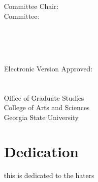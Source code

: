 \documentclass[12pt]{report}
\begin{document}
  \hspace{0.33\textwidth}
  \begin{minipage}[t]{0.33\textwidth}
  Committee Chair:\\
  Committee: \\
  \end{minipage}%
  \begin{minipage}[t]{0.33\textwidth}
  \begin{flushright}
   \\
   \\
   \\
  \end{flushright}
  \end{minipage}%
  \vspace{1cm}
  
  \parbox[b]{\textwidth}{
  Electronic Version Approved:\\\\\\
  Office of Graduate Studies\\
  College of Arts and Sciences\\
  Georgia State University\\
   
  }


\setcounter{page}{4}
  


\tableofcontents
\newpage

{}
\listoftables
\newpage

{}
\listoffigures
\newpage

\cleardoublepage
{}

\newpage

\setcounter{page}{4}

\hypertarget{dedication}{%
\section*{Dedication}\label{dedication}}

this is dedicated to the haters

{} 

\newpage



		
\end{document}
